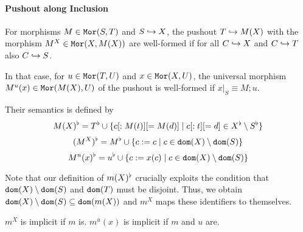 \paragraph{Pushout along Inclusion}
For morphisms $M\in\mathtt{Mor}(S,T)$ and $S\hookrightarrow X$, the pushout $T\hookrightarrow M(X)$ with the morphism $M^X\in\mathtt{Mor}(X,M(X))$ are well-formed if for all $C\hookrightarrow X$ and $C\hookrightarrow T$ also $C\hookrightarrow S$.

In that case, for $u\in\mathtt{Mor}(T,U)$ and $x\in\mathtt{Mor}(X,U)$, the universal morphism $M^u(x)\in\mathtt{Mor}(M(X),U)$ of the pushout is well-formed if $x|_S\equiv M;u$.

Their semantics is defined by
\[M(X)^\flat=T^\flat\cup \{c[:M(t)][=M(d)]\;|\;c[:t][=d]\in X^\flat\setminus S^\flat\}\]
\[(M^X)^\flat=M^\flat\cup\{c:=c\;|\;c\in\mathtt{dom}(X)\setminus\mathtt{dom}(S)\}\]
\[M^u(x)^\flat=u^\flat\cup\{c:=x(c)\;|\;c\in\mathtt{dom}(X)\setminus\mathtt{dom}(S)\}\]

Note that our definition of $m(X)^\flat$ crucially exploits the condition that $\mathtt{dom}(X)\setminus\mathtt{dom}(S)$ and $\mathtt{dom}(T)$ must be disjoint.
Thus, we obtain $\mathtt{dom}(X)\setminus\mathtt{dom}(S)\subseteq\mathtt{dom}(m(X))$ and $m^X$ maps these identifiers to themselves.


$m^X$ is implicit if $m$ is.
$m^u(x)$ is implicit if $m$ and $u$ are.


%  
%
%  
%

